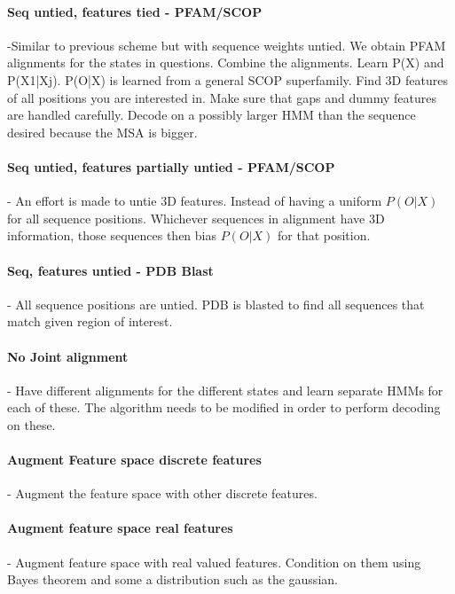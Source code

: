 \documentclass{article}
\begin{document}
\paragraph{Seq untied, features tied - PFAM/SCOP} -Similar to previous scheme but with sequence weights untied. We obtain PFAM alignments for the states in questions. Combine the alignments. Learn P(X) and P(X1|Xj). P(O|X) is learned from a general SCOP superfamily. Find 3D features of all positions you are interested in. Make sure that gaps and dummy features are handled carefully. Decode on a possibly larger HMM than the sequence desired because the MSA is bigger. 

\paragraph{Seq untied, features partially untied - PFAM/SCOP} - An effort is made to untie 3D features. Instead of having a uniform $P(O|X)$ for all sequence positions. Whichever sequences in alignment have 3D information, those sequences then bias $P(O|X)$ for that position. 

\paragraph{Seq, features untied - PDB Blast} - All sequence positions are untied. PDB is blasted to find all sequences that match given region of interest. 

\paragraph{No Joint alignment} - Have different alignments for the different states and learn separate HMMs for each of these. The algorithm needs to be modified in order to perform decoding on these. 

\paragraph{Augment Feature space discrete features} - Augment the feature space with other discrete features. 

\paragraph{Augment feature space real features }  - Augment feature space with real valued features. Condition on them using Bayes theorem and some a distribution such as the gaussian. 
\end{document}
